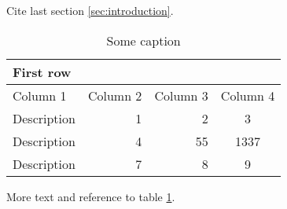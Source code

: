 Cite last section \ref{sec:introduction}.

\begin{table}[h]
    \caption{Some caption}
    \centering
    \begin{tabular}{lrrc}
        \toprule
        First row \\
        \midrule
        Column 1 & Column 2 & Column 3 & Column 4\\
        \midrule
        Description & 1 & 2 & 3 \\
        Description & 4 & 55 & 1337 \\
        Description & 7 & 8 & 9 \\
        \bottomrule
    \end{tabular}
    \label{tab:mytable}
\end{table}

More text and reference to table \ref{tab:mytable}.
